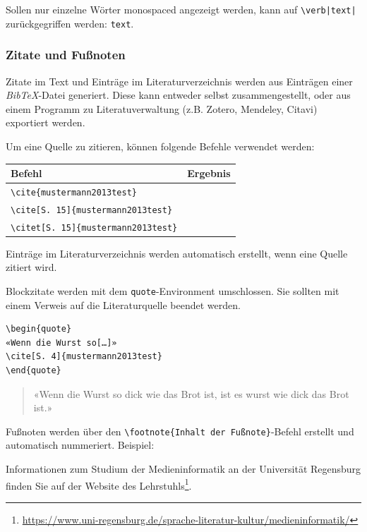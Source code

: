 Sollen nur einzelne Wörter monospaced angezeigt werden, kann auf \verb!\verb|text|! zurückgegriffen werden: \verb|text|.

\subsubsection{Zitate und Fußnoten}


Zitate im Text und Einträge im Literaturverzeichnis werden aus Einträgen einer \emph{BibTeX}-Datei generiert.
Diese kann entweder selbst zusammengestellt, oder aus einem Programm zu Literatuverwaltung (z.B. Zotero, Mendeley, Citavi) exportiert werden.

Um eine Quelle zu zitieren, können folgende Befehle verwendet werden:

\bigskip

\begin{tabular}{@{}ll@{}}
\hline
\textbf{Befehl} & \textbf{Ergebnis} \\
\hline
    \verb|\cite{mustermann2013test}| & \cite{mustermann2013test} \\
    \verb|\cite[S. 15]{mustermann2013test}| & \cite[S. 15]{mustermann2013test} \\
    \verb|\citet[S. 15]{mustermann2013test}| & \citet[S. 15]{mustermann2013test} \\
\hline
\end{tabular}

\bigskip

Einträge im Literaturverzeichnis werden automatisch erstellt, wenn eine Quelle zitiert wird.


Blockzitate werden mit dem \verb|quote|-Environment umschlossen.
Sie sollten mit einem Verweis auf die Literaturquelle beendet werden.

\begin{verbatim}
\begin{quote}
«Wenn die Wurst so[…]»
\cite[S. 4]{mustermann2013test}
\end{quote}
\end{verbatim}

\begin{quote}
«Wenn die Wurst so dick wie das Brot ist, ist es wurst wie dick das Brot ist.»
\cite[S. 4]{mustermann2013test}
\end{quote}


Fußnoten werden über den \verb|\footnote{Inhalt der Fußnote}|-Befehl erstellt und automatisch nummeriert. Beispiel:

Informationen zum Studium der Medieninformatik an der Universität Regensburg finden Sie auf der Website des Lehrstuhls\footnote{\url{https://www.uni-regensburg.de/sprache-literatur-kultur/medieninformatik/}}.
